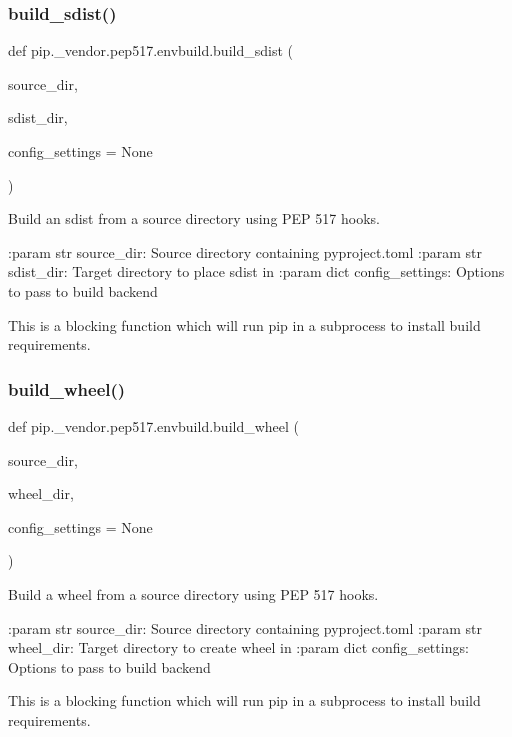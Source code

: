 \subsubsection{\texorpdfstring{build\+\_\+sdist()}{build\_sdist()}}
{\footnotesize\ttfamily def pip.\+\_\+vendor.\+pep517.\+envbuild.\+build\+\_\+sdist (\begin{DoxyParamCaption}\item[{}]{source\+\_\+dir,  }\item[{}]{sdist\+\_\+dir,  }\item[{}]{config\+\_\+settings = {\ttfamily None} }\end{DoxyParamCaption})}

\begin{DoxyVerb}Build an sdist from a source directory using PEP 517 hooks.

:param str source_dir: Source directory containing pyproject.toml
:param str sdist_dir: Target directory to place sdist in
:param dict config_settings: Options to pass to build backend

This is a blocking function which will run pip in a subprocess to install
build requirements.
\end{DoxyVerb}
 \mbox{\label{namespacepip_1_1__vendor_1_1pep517_1_1envbuild_af765376719840d88237aff568acf11ec}} 
\subsubsection{\texorpdfstring{build\+\_\+wheel()}{build\_wheel()}}
{\footnotesize\ttfamily def pip.\+\_\+vendor.\+pep517.\+envbuild.\+build\+\_\+wheel (\begin{DoxyParamCaption}\item[{}]{source\+\_\+dir,  }\item[{}]{wheel\+\_\+dir,  }\item[{}]{config\+\_\+settings = {\ttfamily None} }\end{DoxyParamCaption})}

\begin{DoxyVerb}Build a wheel from a source directory using PEP 517 hooks.

:param str source_dir: Source directory containing pyproject.toml
:param str wheel_dir: Target directory to create wheel in
:param dict config_settings: Options to pass to build backend

This is a blocking function which will run pip in a subprocess to install
build requirements.
\end{DoxyVerb}
 

